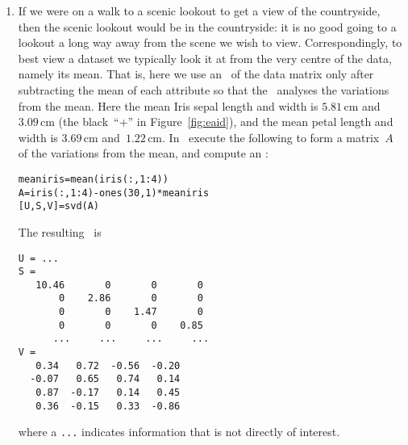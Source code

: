 \begin{example}
\begin{solution}
\begin{enumerate}
\item If we were on a walk to a scenic lookout to get a view of the countryside, then the scenic lookout would be in the countryside: it is no good going to a lookout a long way away from the scene we wish to view.
Correspondingly, to best view a dataset we typically look it at from the very centre of the data, namely its mean.
That is, here we use an \svd\ of the data matrix only after subtracting the mean of each attribute so that the \svd\ analyses the variations from the mean.
Here the mean Iris sepal length and width is \(5.81\)\,cm and~\(3.09\)\,cm (the black~``+'' in Figure~\ref{fig:eaid}), and the mean petal length and width is \(3.69\)\,cm and~\(1.22\)\,cm.
In \script\ execute the following to form a matrix~\(A\) of the variations from the mean, and compute an \svd:
\begin{verbatim}
meaniris=mean(iris(:,1:4))
A=iris(:,1:4)-ones(30,1)*meaniris
[U,S,V]=svd(A)
\end{verbatim}
\setbox\ajrqrbox\hbox{}%
\marginpar{\usebox{\ajrqrbox\\[2ex]}}%
The resulting \svd\ is \twodp
\begin{verbatim}
U = ...
S =
   10.46       0       0       0
       0    2.86       0       0
       0       0    1.47       0
       0       0       0    0.85
      ...     ...     ...     ...
V =
   0.34   0.72  -0.56  -0.20
  -0.07   0.65   0.74   0.14
   0.87  -0.17   0.14   0.45
   0.36  -0.15   0.33  -0.86
\end{verbatim}
where a \verb|...| indicates information that is not directly of interest.


\end{enumerate}
\end{solution}
\end{example}
